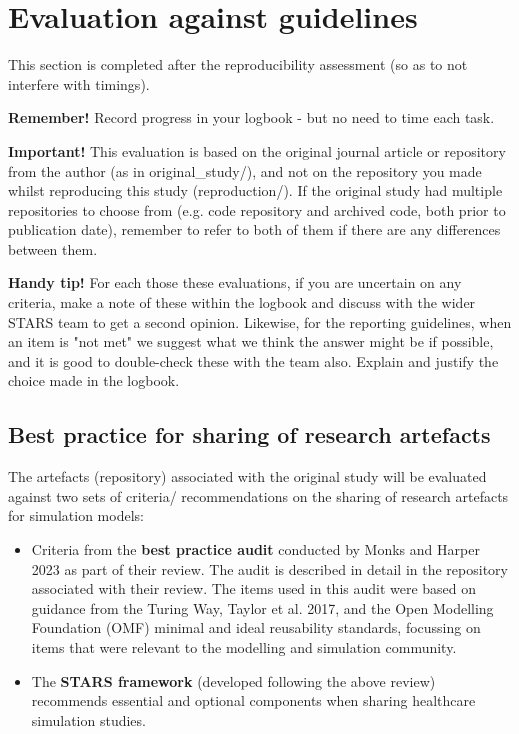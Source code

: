 \section{Evaluation against guidelines}

This section is completed after the reproducibility assessment (so as to not interfere with timings).

\textbf{Remember!} Record progress in your logbook - but no need to time each task.

\textbf{Important!} This evaluation is based on the original journal article or repository from the author (as in original\_study/), and not on the repository you made whilst reproducing this study (reproduction/). If the original study had multiple repositories to choose from (e.g. code repository and archived code, both prior to publication date), remember to refer to both of them if there are any differences between them.

\textbf{Handy tip!} For each those these evaluations, if you are uncertain on any criteria, make a note of these within the logbook and discuss with the wider STARS team to get a second opinion. Likewise, for the reporting guidelines, when an item is "not met" we suggest what we think the answer might be if possible, and it is good to double-check these with the team also. Explain and justify the choice made in the logbook.

\vspace{0.5cm}
\subsection{Best practice for sharing of research artefacts}

The artefacts (repository) associated with the original study will be evaluated against two sets of criteria/ recommendations on the sharing of research artefacts for simulation models:
\begin{itemize}
    \item Criteria from the \textbf{best practice audit} conducted by Monks and Harper 2023\autocite{monks_computer_2023} as part of their review. The audit is described in detail in the repository associated with their review.\autocite{monks_supplementary_2024} The items used in this audit were based on guidance from the Turing Way,\autocite{the_turing_way_community_turing_2022} Taylor et al. 2017,\autocite{taylor_open_2017} and the Open Modelling Foundation (OMF) minimal and ideal reusability standards,\autocite{the_open_modeling_foundation_omf_reusability_2024} focussing on items that were relevant to the modelling and simulation community.
    \item The \textbf{STARS framework} (developed following the above review) recommends essential and optional components when sharing healthcare simulation studies.
\end{itemize}

